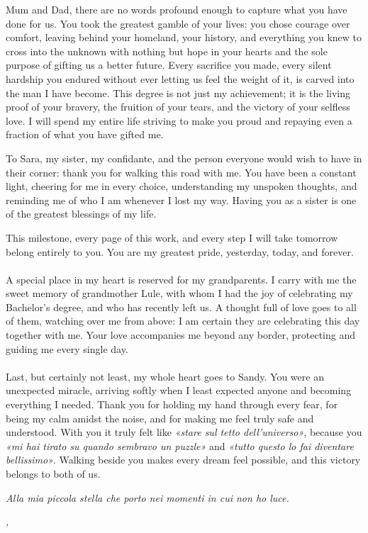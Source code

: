 \noindent Mum and Dad, there are no words profound enough to capture what you have done for us. You took the greatest gamble of your lives: you chose courage over comfort, leaving behind your homeland, your history, and everything you knew to cross into the unknown with nothing but hope in your hearts and the sole purpose of gifting us a better future. Every sacrifice you made, every silent hardship you endured without ever letting us feel the weight of it, is carved into the man I have become. This degree is not just my achievement; it is the living proof of your bravery, the fruition of your tears, and the victory of your selfless love. I will spend my entire life striving to make you proud and repaying even a fraction of what you have gifted me.

\noindent To Sara, my sister, my confidante, and the person everyone would wish to have in their corner: thank you for walking this road with me. You have been a constant light, cheering for me in every choice, understanding my unspoken thoughts, and reminding me of who I am whenever I lost my way. Having you as a sister is one of the greatest blessings of my life.

\noindent This milestone, every page of this work, and every step I will take tomorrow belong entirely to you. You are my greatest pride, yesterday, today, and forever.\\
\\
A special place in my heart is reserved for my grandparents. I carry with me the sweet memory of grandmother Lule, with whom I had the joy of celebrating my Bachelor’s degree, and who has recently left us. A thought full of love goes to all of them, watching over me from above: I am certain they are celebrating this day together with me. Your love accompanies me beyond any border, protecting and guiding me every single day. \\
\\
Last, but certainly not least, my whole heart goes to Sandy. You were an unexpected miracle, arriving softly when I least expected anyone and becoming everything I needed. Thank you for holding my hand through every fear, for being my calm amidst the noise, and for making me feel truly safe and understood. With you it truly felt like \textit{«stare sul tetto dell'universo»}, because you \textit{«mi hai tirato su quando sembravo un puzzle»} and \textit{«tutto questo lo fai diventare bellissimo»}. Walking beside you makes every dream feel possible, and this victory belongs to both of us.

\noindent \textit{Alla mia piccola stella che porto nei momenti in cui non ho luce.}
\bigskip

\noindent\textit{\myLocation, \myTime}
\hfill \myName

\endgroup

